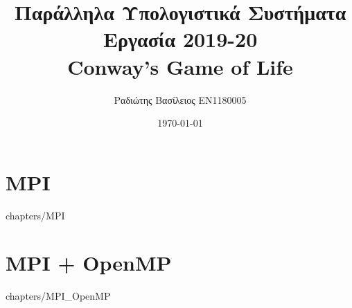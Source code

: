 \documentclass[a4paper,twoside,12pt]{report}
\title {Παράλληλα Υπολογιστικά Συστήματα\\Εργασία 2019-20\\Conway’s Game of Life}
\author {Ραδιώτης Βασίλειος EN1180005}
\date {\today}
\begin{document}
\maketitle

\tableofcontents{}

\chapter {MPI}
     {chapters/MPI}

\chapter {MPI + OpenMP}
     {chapters/MPI_OpenMP}
\end{document}
